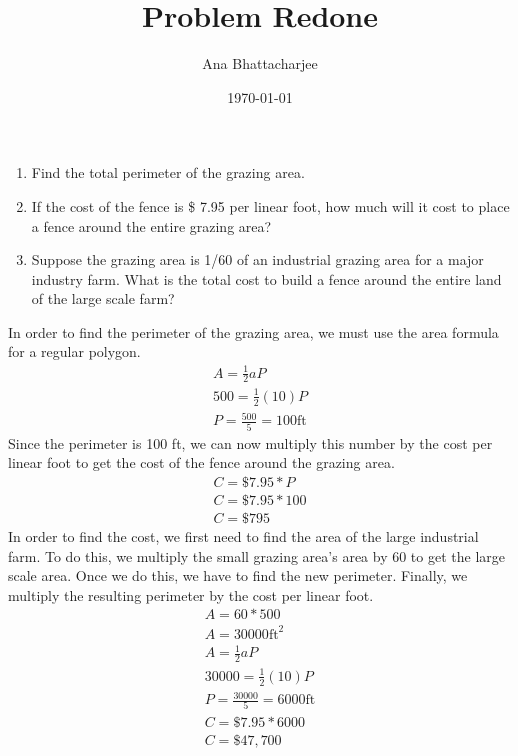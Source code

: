 \documentclass{article}
\begin{document}
\title{Problem Redone}
\author{Ana Bhattacharjee}
\date{\today}
\maketitle
\begin{center}
  \begin{enumerate}
    \item Find the total perimeter of the grazing area.
    \item If the cost of the fence is \$ 7.95 per linear foot, how much will it cost to place a fence around the entire grazing area?
    \item Suppose the grazing area is 1/60 of an industrial grazing area for a major industry farm. What is the total cost to build a fence around the entire land of the large scale farm?
  \end{enumerate}
  In order to find the perimeter of the grazing area, we must use the area formula for a regular polygon.
  \begin{align}
    A = \frac{1}{2}aP \\
    500 = \frac{1}{2}(10)P \\
    P = \frac{500}{5} = 100 \text{ft}
  \end{align}
  Since the perimeter is 100 ft, we can now multiply this number by the cost per linear foot to get the cost of the fence around the grazing area.
  \begin{align}
    C = \$7.95 * P \\
    C = \$7.95 * 100 \\
    C = \$795
  \end{align}
  In order to find the cost, we first need to find the area of the large industrial farm. To do this, we multiply the small grazing area's area by 60 to get the large scale area. Once we do this, we have to find the new perimeter. Finally, we multiply the resulting perimeter by the cost per linear foot.
  \begin{align}
    A = 60 * 500 \\
    A = 30000 \text{ft}^2 \\
    A = \frac{1}{2}aP \\
    30000 = \frac{1}{2} (10) P \\
    P = \frac{30000}{5} = 6000 \text{ft} \\
    C = \$7.95 * 6000 \\
    C = \$47,700
  \end{align}
\end{center}
\end{document}
